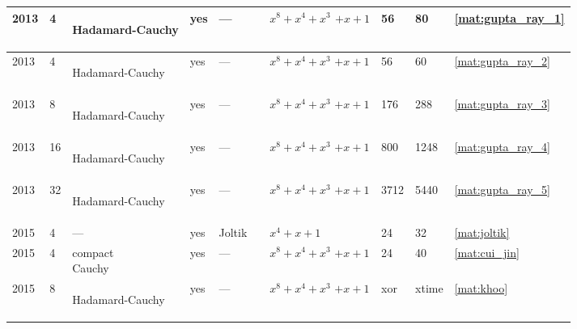\begin{footnotesize}
\begin{longtable}[c]{|l|l|l|l|l|l|l|l|l|l|}
2013 & 4 & \begin{tiny}Hadamard-Cauchy\end{tiny} & yes & --- & \cite{Gupta2013OnCO} & \shortstack{$x^8 + x^4 + x^3$\\$+ x + 1$} & 56 & 80 & \eqref{mat:gupta_ray_1} \\ \hline
2013 & 4 & \begin{tiny}Hadamard-Cauchy\end{tiny} & yes & --- & \cite{Gupta2013OnCO} & \shortstack{$x^8 + x^4 + x^3$\\$+ x + 1$} & 56 & 60 & \eqref{mat:gupta_ray_2} \\ \hline
2013 & 8 & \begin{tiny}Hadamard-Cauchy\end{tiny} & yes & --- & \cite{Gupta2013OnCO} & \shortstack{$x^8 + x^4 + x^3$\\$+ x + 1$} & 176 & 288 & \eqref{mat:gupta_ray_3} \\ \hline
2013 & 16 & \begin{tiny}Hadamard-Cauchy\end{tiny} & yes & --- & \cite{Gupta2013OnCO} & \shortstack{$x^8 + x^4 + x^3$\\$+ x + 1$} & 800 & 1248 & \eqref{mat:gupta_ray_4} \\ \hline
2013 & 32 & \begin{tiny}Hadamard-Cauchy\end{tiny} & yes & --- & \cite{Gupta2013OnCO} & \shortstack{$x^8 + x^4 + x^3$\\$+ x + 1$} & 3712 & 5440 & \eqref{mat:gupta_ray_5} \\ \hline

2015 & 4 & --- & yes & Joltik & \cite{joltik2015} & $x^4+x+1$ & 24 & 32 & \eqref{mat:joltik} \\ \hline

2015 & 4 & \shortstack{compact \\ Cauchy} & yes & --- & \cite{CuiJin2015} & \shortstack{$x^8 + x^4 + x^3$\\$+ x + 1$} & 24 & 40 & \eqref{mat:cui_jin} \\ \hline

2015 & 8 & \begin{tiny}Hadamard-Cauchy\end{tiny} & yes & --- & \cite{LwInvolKhoo2015} & \shortstack{$x^8 + x^4 + x^3$\\$+ x + 1$} & xor & xtime & \eqref{mat:khoo} \\ \hline


\end{longtable}
\end{footnotesize}
